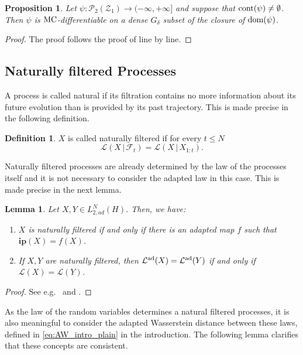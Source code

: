 \documentclass[a4paper]{amsart}
\numberwithin{theorem}{section}
\newtheorem{lemma}[theorem]{Lemma}
\newtheorem{proposition}[theorem]{Proposition}
\theoremstyle{definition}
\newtheorem{definition}[theorem]{Definition}
\newcommand{\F}{\mathcal{F}}
\newcommand{\law}{\mathcal{L}}
\newcommand{\dom}{\textup{dom}}
\newcommand{\Pc}{\mathcal P}
\newcommand{\cont}{\textup{cont}}
\newcommand{\mc}{\textup{MC}}
\newcommand{\lawad}{\law^{\textup{ad}}}
\newcommand{\Zc}{\mathcal{Z}}
\newcommand{\ipp}{\mathbf{ip}}
\begin{document}
\begin{proposition}\label{prop:MCdfb_Gdelta_FP}
Let $\psi : \Pc_2(\Zc_1) \to (-\infty,+\infty]$ and suppose that $\cont(\psi)\neq\emptyset$. Then $\psi$ is $\mc$-differentiable on a dense $G_\delta$ subset of the closure of $\dom(\psi)$. 
\end{proposition}
\begin{proof}
    The proof follows the proof of  line by line.
\end{proof}




\subsection{Naturally filtered Processes}

A process is called natural if its filtration contains no more information about its future evolution than is provided by its past trajectory.
This is made precise in the following definition.
\begin{definition}
    $X$ is called naturally filtered if for every $t \le N$
    \[
    \law(X \, |  \, \F_t) = \law(X  \, | \, X_{1:t}).
    \]
\end{definition}
Naturally filtered processes are already determined by the law of the processes itself and it is not necessary to consider the adapted law in this case. This is made precise in the next lemma.

\begin{lemma} \label{lem:plain_char}
    Let $X, Y \in L_{2,ad}^N(H)$. Then, we have:
    \begin{enumerate}
        \item $X$ is naturally filtered if and only if there is an adapted map $f$ such that $\ipp(X)=f(X)$.
        \item If $X,Y$ are naturally filtered, then $\lawad(X) = \lawad(Y)$ if and only if $\law(X)=\law(Y)$.
    \end{enumerate}
\end{lemma}
\begin{proof}
See e.g.\ \cite[Section 3]{BePfSc24} and \cite[Lemma 2.3]{Pa22}.
\end{proof}

As the law of the random variables determines a natural filtered processes, it is also meaningful to consider the adapted Wasserstein distance between these laws,  defined in \eqref{eq:AW_intro_plain} in the introduction. The following lemma clarifies that these concepts are consistent.
\end{document}
